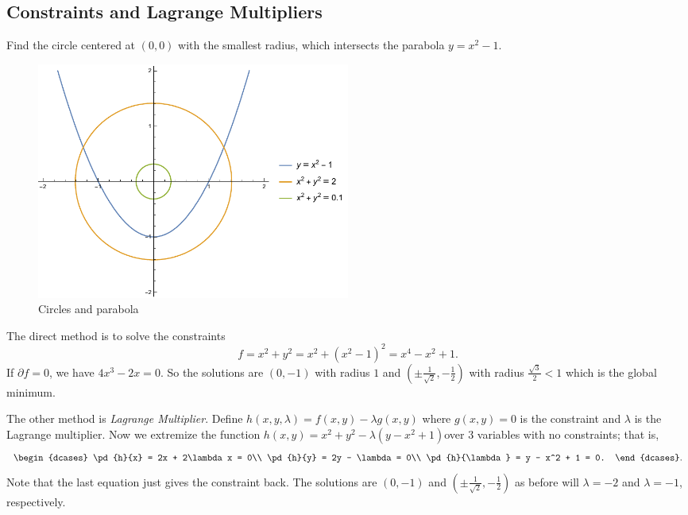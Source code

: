 \subsection{Constraints and Lagrange Multipliers}
\begin{example}
    Find the circle centered at \((0,0)\) with the smallest radius, which intersects the parabola \(y = x^2 - 1\).
    \begin{figure}[htpb]
        \centering
        \includegraphics[width=0.5\textwidth]{Figures/fig_1_2.pdf}
        \caption{Circles and parabola}
        \label{fig_1_2}
    \end{figure}
    
    The direct method is to solve the constraints
    \[
        f = x^2 + y^2 = x^2 + (x^2 - 1)^2 = x^4 - x^2 + 1.
    \]
    If \(\partial f = 0\), we have \(4x^3 - 2x = 0\). So the solutions are \((0, -1)\) with radius \(1\) and \((\pm \frac{1}{\sqrt{2}}, -\frac{1}{2})\) with radius \(\frac{\sqrt{3}}{2} < 1\) which is the global minimum.

    The other method is \textit{Lagrange Multiplier}. Define \(h(x, y, \lambda) = f(x, y) - \lambda g(x, y)\) where \(g(x, y) = 0\) is the constraint and \(\lambda\) is the Lagrange multiplier. Now we extremize the function \(h(x,y) = x^2 + y^2 - \lambda(y - x^2 + 1)\)over 3 variables with no constraints; that is,
    \[
        \begin{dcases}
            \pd{h}{x} = 2x + 2\lambda x = 0\\
            \pd{h}{y} = 2y - \lambda = 0\\
            \pd{h}{\lambda} = y - x^2 + 1 = 0.
        \end{dcases}.
    \]
    Note that the last equation just gives the constraint back. The solutions are \((0, -1)\) and \((\pm \frac{1}{\sqrt{2}}, -\frac{1}{2})\) as before will \(\lambda = -2\) and \(\lambda = -1\), respectively.
\end{example}

